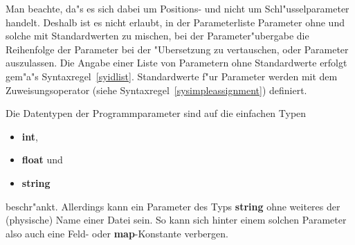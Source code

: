 Man beachte, da"s es sich dabei um Positions- und nicht um
Schl"usselparameter handelt.  Deshalb ist es nicht erlaubt, in der
Parameterliste Parameter ohne und solche mit Standardwerten zu
mischen, bei der Parameter"ubergabe die Reihenfolge der Parameter bei
der "Ubersetzung zu vertauschen, oder Parameter auszulassen.  Die
Angabe einer Liste von Parametern ohne Standardwerte erfolgt gem"a"s
Syntaxregel~\ref{syidlist}.  Standardwerte f"ur Parameter werden mit
dem Zuweisungsoperator (siehe Syntaxregel~\ref{sysimpleassignment})
definiert.

\begin{center}
\end{center}

Die Datentypen der Programmparameter
  sind auf die einfachen Typen

\begin{itemize}
  \item {\bf int},
  \item {\bf float} und
  \item {\bf string}
\end{itemize}

beschr"ankt. Allerdings kann ein Parameter des Typs {\bf
string} ohne weiteres der (physische) Name einer
Datei sein. So kann
sich hinter einem solchen Parameter also auch eine Feld- oder {\bf
map}-Konstante verbergen.

